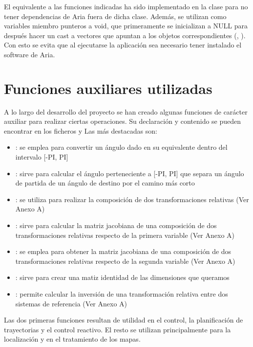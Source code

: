 El equivalente a las funciones indicadas ha sido implementado en la clase  para no tener dependencias de Aria fuera de dicha clase.
Además, se utilizan como variables miembro punteros a void, que primeramente se inicializan a NULL para después hacer un cast a vectores que apuntan a los objetos correspondientes (, ). Con esto se evita que al ejecutarse la aplicación sea necesario tener instalado el software de Aria.

\section{Funciones auxiliares utilizadas}
A lo largo del desarrollo del proyecto se han creado algunas funciones de carácter auxiliar para realizar ciertas operaciones. Su declaración y contenido se pueden encontrar en los ficheros  y  Las más destacadas son:

\begin{itemize}
  \item {}: se emplea para convertir un ángulo dado en su equivalente dentro del intervalo [-PI, PI]
  \item {}: sirve para calcular el ángulo perteneciente a [-PI, PI] que separa un ángulo de partida de un ángulo de destino por el camino más corto
  \item {}: se utiliza para realizar la composición de dos transformaciones relativas (Ver Anexo A)
  \item {}: sirve para calcular la matriz jacobiana de una composición de dos transformaciones relativas respecto de la primera variable (Ver Anexo A)
  \item {}: se emplea para obtener la matriz jacobiana de una composición de dos transformaciones relativas respecto de la segunda variable (Ver Anexo A)
  \item {}: sirve para crear una matiz identidad de las dimensiones que queramos
  \item {}: permite calcular la inversión de una transformación relativa entre dos sistemas de referencia (Ver Anexo A)
\end{itemize}

Las dos primeras funciones resultan de utilidad en el control, la planificación de trayectorias y el control reactivo. El resto se utilizan principalmente para la localización y en el tratamiento de los mapas.

